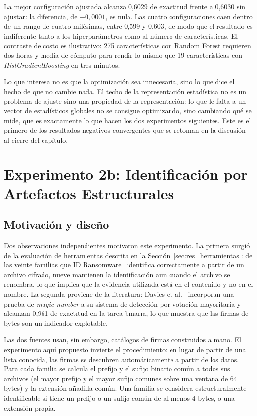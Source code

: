 La mejor configuración ajustada alcanza 0,6029 de exactitud frente a 0,6030 sin ajustar: la diferencia, de $-0{,}0001$, es nula. Las cuatro configuraciones caen dentro de un rango de cuatro milésimas, entre 0,599 y 0,603, de modo que el resultado es indiferente tanto a los hiperparámetros como al número de características. El contraste de costo es ilustrativo: 275 características con Random Forest requieren dos horas y media de cómputo para rendir lo mismo que 19 características con \textit{HistGradientBoosting} en tres minutos.

Lo que interesa no es que la optimización sea innecesaria, sino lo que dice el hecho de que no cambie nada. El techo de la representación estadística no es un problema de ajuste sino una propiedad de la representación: lo que le falta a un vector de estadísticos globales no se consigue optimizando, sino cambiando qué se mide, que es exactamente lo que hacen los dos experimentos siguientes. Este es el primero de los resultados negativos convergentes que se retoman en la discusión al cierre del capítulo.

\section{Experimento 2b: Identificación por Artefactos Estructurales}
\label{sec:exp2b}

\subsection{Motivación y diseño}

Dos observaciones independientes motivaron este experimento. La primera surgió de la evaluación de herramientas descrita en la Sección~\ref{sec:res_herramientas}: de las veinte familias que ID Ransomware~\cite{idransomware} identifica correctamente a partir de un archivo cifrado, nueve mantienen la identificación aun cuando el archivo se renombra, lo que implica que la evidencia utilizada está en el contenido y no en el nombre. La segunda proviene de la literatura: Davies et al.~\cite{davies2023majority} incorporan una prueba de \textit{magic number} a su sistema de detección por votación mayoritaria y alcanzan 0,961 de exactitud en la tarea binaria, lo que muestra que las firmas de bytes son un indicador explotable.

Las dos fuentes usan, sin embargo, catálogos de firmas construidos a mano. El experimento aquí propuesto invierte el procedimiento: en lugar de partir de una lista conocida, las firmas se descubren automáticamente a partir de los datos. Para cada familia se calcula el prefijo y el sufijo binario común a todos sus archivos (el mayor prefijo y el mayor sufijo comunes sobre una ventana de 64 bytes) y la extensión añadida común. Una familia se considera estructuralmente identificable si tiene un prefijo o un sufijo común de al menos 4 bytes, o una extensión propia.

